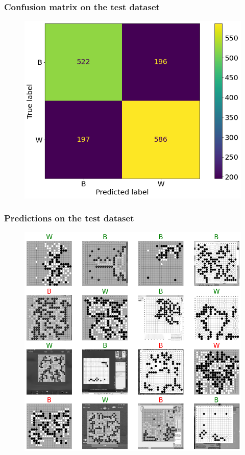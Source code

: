 \documentclass{beamer}
\begin{document}

\begin{frame}
\frametitle{Confusion matrix on the test dataset}

\begin{figure}
	\centering
	\includegraphics[scale=0.4]{images/confusion_matrix_td.png}
\end{figure}


\end{frame}


\begin{frame}
\frametitle{Predictions on the test dataset}

\begin{figure}
	\centering
	\includegraphics[scale=0.25]{images/predictions.png}
\end{figure}


\end{frame}
\end{document}
